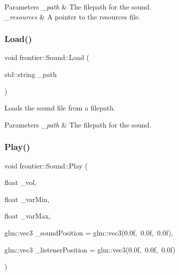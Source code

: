 \begin{DoxyParams}{Parameters}
{\em \+\_\+path} & The filepath for the sound. \\
\hline
{\em \+\_\+resources} & A pointer to the resources file. \\
\hline
\end{DoxyParams}
\mbox{\label{classfrontier_1_1_sound_a9a34b2a30c3eb91702b07c35de9d140b}} 
\subsubsection{\texorpdfstring{Load()}{Load()}}
{\footnotesize\ttfamily void frontier\+::\+Sound\+::\+Load (\begin{DoxyParamCaption}\item[{std\+::string}]{\+\_\+path }\end{DoxyParamCaption})}



Loads the sound file from a filepath. 


\begin{DoxyParams}{Parameters}
{\em \+\_\+path} & The filepath for the sound. \\
\hline
\end{DoxyParams}
\mbox{\label{classfrontier_1_1_sound_a10dbe1366c8069e71e4d3d9f3d8def59}} 
\subsubsection{\texorpdfstring{Play()}{Play()}\hspace{0.1cm}{\footnotesize\ttfamily [1/2]}}
{\footnotesize\ttfamily void frontier\+::\+Sound\+::\+Play (\begin{DoxyParamCaption}\item[{float}]{\+\_\+vol,  }\item[{float}]{\+\_\+var\+Min,  }\item[{float}]{\+\_\+var\+Max,  }\item[{glm\+::vec3}]{\+\_\+sound\+Position = {\ttfamily glm\+:\+:vec3(0.0f,~0.0f,~0.0f)},  }\item[{glm\+::vec3}]{\+\_\+listener\+Position = {\ttfamily glm\+:\+:vec3(0.0f,~0.0f,~0.0f)} }\end{DoxyParamCaption})}



